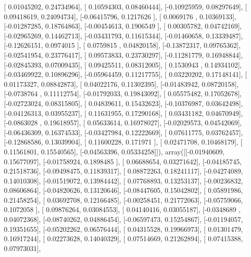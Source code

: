 \documentclass{article}
\begin{document}
       [ 0.01045202,  0.24734964],
       [ 0.10594303,  0.08460444],
       [-0.10925959,  0.08297649],
       [ 0.09418619,  0.24094734],
       [-0.06415796,  0.1217626 ],
       [ 0.0069176 ,  0.10369133],
       [-0.01287285,  0.18764863],
       [-0.00454613,  0.1906549 ],
       [ 0.00305782,  0.04742169],
       [-0.02965269,  0.14462713],
       [-0.03431793,  0.11615344],
       [-0.01460658,  0.13339487],
       [-0.12626151,  0.0974015 ],
       [ 0.0759815 ,  0.04820158],
       [-0.13872317,  0.09765362],
       [-0.02541954,  0.23776417],
       [ 0.09573833,  0.23730297],
       [-0.11281779,  0.16948844],
       [-0.02845393,  0.07009435],
       [ 0.09425511,  0.08312005],
       [ 0.1530943 ,  0.14934102],
       [-0.03469922,  0.10896296],
       [-0.05964459,  0.11217755],
       [ 0.03220202,  0.17148141],
       [ 0.01173327,  0.08842873],
       [ 0.04022176,  0.11302395],
       [-0.01483942,  0.08720158],
       [-0.0738764 ,  0.11112754],
       [-0.01792033,  0.19843092],
       [ 0.05575482,  0.17052678],
       [-0.02723024,  0.08315805],
       [ 0.04839611,  0.15432623],
       [-0.10376987,  0.03642498],
       [-0.04126313,  0.03955237],
       [ 0.11631955,  0.17290168],
       [ 0.03431182,  0.04670949],
       [-0.0863028 ,  0.19618957],
       [ 0.05633614,  0.16978027],
       [-0.02029573,  0.04542069],
       [-0.06436309,  0.16374533],
       [-0.03427984,  0.12222669],
       [ 0.07611775,  0.03762457],
       [-0.12868586,  0.13039904],
       [ 0.11600228,  0.171971  ],
       [ 0.02471708,  0.10468179],
       [ 0.11561801,  0.15540565],
       [-0.04563396,  0.05334258]]), array([[-0.01940609,  0.15677097],
       [-0.01758924,  0.1898485 ],
       [ 0.06688654,  0.03271642],
       [-0.04185745,  0.21518736],
       [-0.09498475,  0.11839317],
       [ 0.08872263,  0.18241117],
       [-0.04274089,  0.14010308],
       [-0.01519072,  0.13984442],
       [ 0.07768893,  0.13253137],
       [-0.00236832,  0.08606864],
       [-0.04820626,  0.13120646],
       [-0.08447605,  0.15042802],
       [ 0.05891986,  0.21458254],
       [ 0.03692708,  0.12166485],
       [-0.00258451,  0.21772063],
       [-0.05759066,  0.1072058 ],
       [ 0.09876264,  0.03084553],
       [ 0.04140416,  0.03055187],
       [-0.0348689 ,  0.04072368],
       [-0.08740262,  0.04886454],
       [-0.06597473,  0.15254867],
       [-0.01194057,  0.19351655],
       [-0.05202262,  0.06576444],
       [ 0.04315528,  0.19966973],
       [ 0.01301479,  0.16917244],
       [ 0.02273628,  0.14040329],
       [ 0.07514669,  0.21262894],
       [ 0.07415388,  0.07973031],
\end{document}
